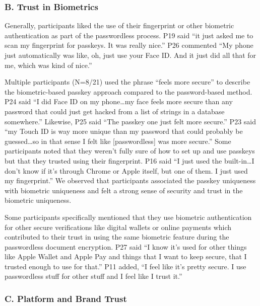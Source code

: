 \subsubsection*{B. Trust in Biometrics}

Generally, participants liked the use of their fingerprint or other biometric authentication as part of the passwordless process. P19 said ``it just asked me to scan my fingerprint for passkeys. It was really nice.'' P26 commented ``My phone just automatically was like, oh, just use your Face ID. And it just did all that for me, which was kind of nice.''

Multiple participants (N=8/21) used the phrase ``feels more secure'' to describe the biometric-based passkey approach compared to the password-based method. P24 said ``I did Face ID on my phone\ldots my face feels more secure than any password that could just get hacked from a list of strings in a database somewhere.'' Likewise, P25 said ``The passkey one just felt more secure.'' P23 said ``my Touch ID is way more unique than my password that could probably be guessed\ldots so in that sense I felt like [passwordless] was more secure.'' Some participants noted that they weren't fully sure of how to set up and use passkeys but that they trusted using their fingerprint. P16 said ``I just used the built-in\ldots I don't know if it's through Chrome or Apple itself, but one of them. I just used my fingerprint.'' We observed that participants associated the passkey uniqueness with biometric uniqueness and felt a strong sense of security and trust in the biometric uniqueness.

Some participants specifically mentioned that they use biometric authentication for other secure verifications like digital wallets or online payments which contributed to their trust in using the same biometric feature during the passwordless document encryption. P27 said ``I know it's used for other things like Apple Wallet\textregistered{} and Apple Pay\textregistered{} and things that I want to keep secure, that I trusted enough to use for that.'' P11 added, ``I feel like it's pretty secure. I use passwordless stuff for other stuff and I feel like I trust it.''

\subsubsection*{C. Platform and Brand Trust}

